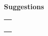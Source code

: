 \begin{multicols}{2}
  \textbf{Suggestions}
  \begin{center}
    \begin{tabularx}{0.8\columnwidth}{l}
    \hline \\
    \hline \\
    \hline \\
    \hline \\
    \hline \\
    \end{tabularx}
  \end{center}
  \vspace*{-1.5cm}  %
\end{multicols}

\endinput
        
